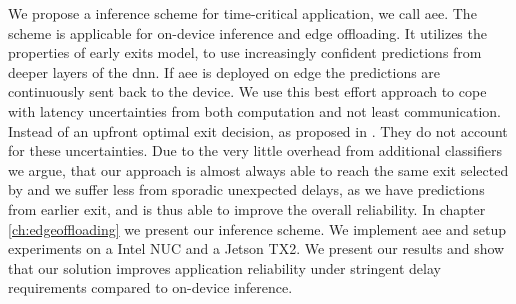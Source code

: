 We propose a inference scheme for time-critical application, we call \gls{aee}. The scheme is applicable for on-device inference and edge offloading. It utilizes the properties of early exits model, to use increasingly confident predictions from deeper layers of the \gls{dnn}. If \gls{aee} is deployed on edge the predictions are continuously sent back to the device. We use this best effort approach to cope with latency uncertainties from both computation and not least communication. Instead of an upfront optimal exit decision, as proposed in \cite{li_edge_2018}. They do not account for these uncertainties. Due to the very little overhead from additional classifiers we argue, that our approach is almost always able to reach the same exit selected by \cite{li_edge_2018} and we suffer less from sporadic unexpected delays, as we have predictions from earlier exit, and is thus able to improve the overall reliability. In chapter \ref{ch:edgeoffloading} we present our inference scheme. We implement \gls{aee} and setup experiments on a Intel NUC and a Jetson TX2. We present our results and show that our solution improves application reliability under stringent delay requirements compared to on-device inference.